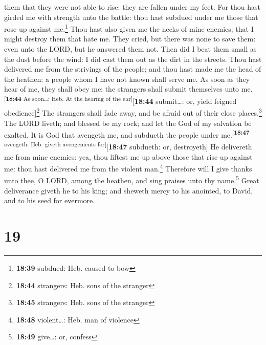 them that they were not able to rise: they are fallen under my feet.
 For thou hast girded me with strength unto the battle:
thou hast subdued under me those that rose up against me.\footnote{\textbf{18:39}
  subdued: Heb. caused to bow}  Thou hast also given me
the necks of mine enemies; that I might destroy them that hate me.
 They cried, but there was none to save them: even unto
the LORD, but he answered them not.  Then did I beat them
small as the dust before the wind: I did cast them out as the dirt in
the streets.  Thou hast delivered me from the strivings
of the people; and thou hast made me the head of the heathen: a people
whom I have not known shall serve me.  As soon as they
hear of me, they shall obey me: the strangers shall submit themselves
unto me.\textsuperscript{{[}\textbf{18:44} As soon\ldots: Heb. At the
hearing of the ear{]}}{[}\textbf{18:44} submit\ldots: or, yield feigned
obedience{]}\footnote{\textbf{18:44} strangers: Heb. sons of the
  stranger}  The strangers shall fade away, and be afraid
out of their close places.\footnote{\textbf{18:45} strangers: Heb. sons
  of the stranger}  The LORD liveth; and blessed be my
rock; and let the God of my salvation be exalted.  It is
God that avengeth me, and subdueth the people under
me.\textsuperscript{{[}\textbf{18:47} avengeth: Heb. giveth avengements
for{]}}{[}\textbf{18:47} subdueth: or, destroyeth{]}  He
delivereth me from mine enemies: yea, thou liftest me up above those
that rise up against me: thou hast delivered me from the violent
man.\footnote{\textbf{18:48} violent\ldots: Heb. man of violence}
 Therefore will I give thanks unto thee, O LORD, among
the heathen, and sing praises unto thy name.\footnote{\textbf{18:49}
  give\ldots: or, confess}  Great deliverance giveth he
to his king; and sheweth mercy to his anointed, to David, and to his
seed for evermore.

\hypertarget{section-18}{%
\section{19}\label{section-18}}

